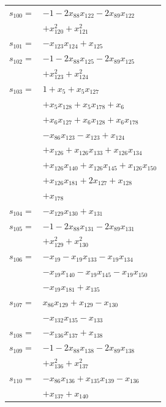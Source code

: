 \begin{longtable}{@{}r@{\;}l@{}}
\(s_{100}=\) & \(\displaystyle -1 -2x_{88}x_{122} -2x_{89}x_{122}\) \\
 & \(\displaystyle +x_{120}^{2} +x_{121}^{2}\) \\[3pt]
\(s_{101}=\) & \(\displaystyle -x_{123}x_{124} +x_{125}\) \\[3pt]
\(s_{102}=\) & \(\displaystyle -1 -2x_{88}x_{125} -2x_{89}x_{125}\) \\
 & \(\displaystyle +x_{123}^{2} +x_{124}^{2}\) \\[3pt]
\(s_{103}=\) & \(\displaystyle 1 +x_{5} +x_{5}x_{127}\) \\
 & \(\displaystyle +x_{5}x_{128} +x_{5}x_{178} +x_{6}\) \\
 & \(\displaystyle +x_{6}x_{127} +x_{6}x_{128} +x_{6}x_{178}\) \\
 & \(\displaystyle -x_{86}x_{123} -x_{123} +x_{124}\) \\
 & \(\displaystyle +x_{126} +x_{126}x_{133} +x_{126}x_{134}\) \\
 & \(\displaystyle +x_{126}x_{140} +x_{126}x_{145} +x_{126}x_{150}\) \\
 & \(\displaystyle +x_{126}x_{181} +2x_{127} +x_{128}\) \\
 & \(\displaystyle +x_{178}\) \\[3pt]
\(s_{104}=\) & \(\displaystyle -x_{129}x_{130} +x_{131}\) \\[3pt]
\(s_{105}=\) & \(\displaystyle -1 -2x_{88}x_{131} -2x_{89}x_{131}\) \\
 & \(\displaystyle +x_{129}^{2} +x_{130}^{2}\) \\[3pt]
\(s_{106}=\) & \(\displaystyle -x_{19} -x_{19}x_{133} -x_{19}x_{134}\) \\
 & \(\displaystyle -x_{19}x_{140} -x_{19}x_{145} -x_{19}x_{150}\) \\
 & \(\displaystyle -x_{19}x_{181} +x_{135}\) \\[3pt]
\(s_{107}=\) & \(\displaystyle x_{86}x_{129} +x_{129} -x_{130}\) \\
 & \(\displaystyle -x_{132}x_{135} -x_{133}\) \\[3pt]
\(s_{108}=\) & \(\displaystyle -x_{136}x_{137} +x_{138}\) \\[3pt]
\(s_{109}=\) & \(\displaystyle -1 -2x_{88}x_{138} -2x_{89}x_{138}\) \\
 & \(\displaystyle +x_{136}^{2} +x_{137}^{2}\) \\[3pt]
\(s_{110}=\) & \(\displaystyle -x_{86}x_{136} +x_{135}x_{139} -x_{136}\) \\
 & \(\displaystyle +x_{137} +x_{140}\) \\[3pt]

\end{longtable}
